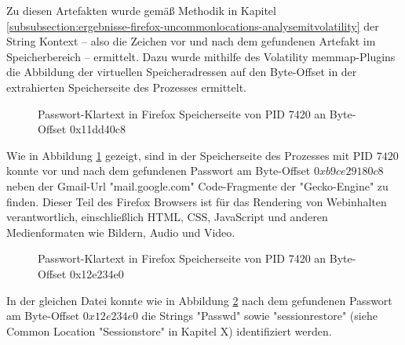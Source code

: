 Zu diesen Artefakten wurde gemäß Methodik in Kapitel \ref{subsubsection:ergebnisse-firefox-uncommonlocations-analysemitvolatility} der String Kontext -- also die Zeichen vor und nach dem gefundenen Artefakt im Speicherbereich -- ermittelt. Dazu wurde mithilfe des Volatility memmap-Plugins die Abbildung der virtuellen Speicheradressen auf den Byte-Offset in der extrahierten Speicherseite des Prozesses ermittelt. 
\begin{figure}[h!]
	\centerline{}
	\label{img:firefox-pw-offset-0x11dd40c8}  
	\caption{Passwort-Klartext in Firefox Speicherseite von PID 7420 an Byte-Offset 0x11dd40c8}
\end{figure}

Wie in Abbildung \ref{img:firefox-pw-offset-0x11dd40c8} gezeigt, sind in der Speicherseite des Prozesses mit PID $7420$ konnte vor und nach dem gefundenen Passwort am Byte-Offset $0xb9ce29180c8$ neben der Gmail-Url "mail.google.com" Code-Fragmente der "Gecko-Engine" zu finden. Dieser Teil des Firefox Browsers ist für das Rendering von Webinhalten verantwortlich, einschließlich HTML, CSS, JavaScript und anderen Medienformaten wie Bildern, Audio und Video.
\begin{figure}[h!]
	\centerline{}
	\label{img:firefox-pw-offset-pid-7420-0x12e234e0}  
	\caption{Passwort-Klartext in Firefox Speicherseite von PID 7420 an Byte-Offset 0x12e234e0}
\end{figure}
In der gleichen Datei konnte wie in Abbildung \ref{img:firefox-pw-offset-pid-7420-0x12e234e0} nach dem gefundenen Passwort am Byte-Offset $0x12e234e0$ die Strings "Passwd" sowie "sessionrestore" (siehe Common Location "Sessionstore" in Kapitel X) identifiziert werden. 

